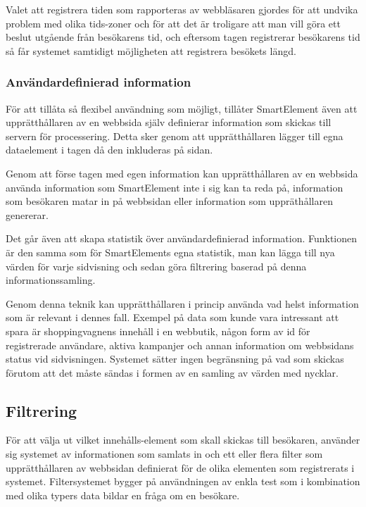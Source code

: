 Valet att registrera tiden som rapporteras av webbläsaren gjordes för att undvika problem med olika tids-zoner och för att det är troligare att man vill göra ett beslut utgående från besökarens tid, och eftersom tagen registrerar besökarens tid så får systemet samtidigt möjligheten att registrera besökets längd.

\subsubsection{Användardefinierad information}

För att tillåta så flexibel användning som möjligt, tillåter SmartElement även att upprätthållaren av en webbsida själv definierar information som skickas till servern för processering. Detta sker genom att upprätthållaren lägger till egna dataelement i tagen då den inkluderas på sidan.

Genom att förse tagen med egen information kan upprätthållaren av en webbsida använda information som SmartElement inte i sig kan ta reda på, information som besökaren matar in på webbsidan eller information som uppräthållaren genererar.

Det går även att skapa statistik över användardefinierad information. Funktionen är den samma som för SmartElements egna statistik, man kan lägga till nya värden för varje sidvisning och sedan göra filtrering baserad på denna informationssamling.

Genom denna teknik kan upprätthållaren i princip använda vad helst information som är relevant i dennes fall. Exempel på data som kunde vara intressant att spara är shoppingvagnens innehåll i en webbutik, någon form av id för registrerade användare, aktiva kampanjer och annan information om webbsidans status vid sidvisningen. Systemet sätter ingen begränsning på vad som skickas förutom att det måste sändas i formen av en samling av värden med nycklar.

\subsection{Filtrering}


För att välja ut vilket innehålls-element som skall skickas till besökaren, använder sig systemet av informationen som samlats in och ett eller flera filter som upprätthållaren av webbsidan definierat för de olika elementen som registrerats i systemet. Filtersystemet bygger på användningen av enkla test som i kombination med olika typers data bildar en fråga om en besökare.

